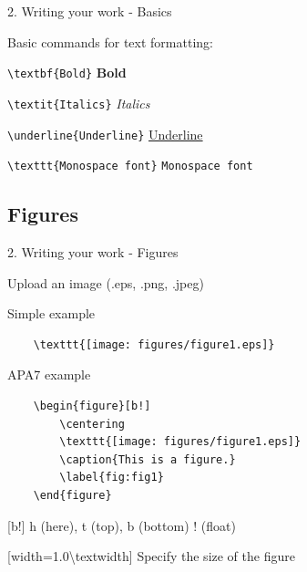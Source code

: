 \documentclass[13pt]{beamer}
\newcommand{\itemA}{\item[\textcolor{black}{\textbullet}]}
\newcommand{\itemB}{\item[\textcolor{black}{\textopenbullet}]}
\newcommand{\green}{\textcolor{colorgreen}}
\begin{document}
\begin{frame}{2. Writing your work - Basics}

 \begin{fullpageitemize}
    \itemA Basic commands for text formatting: \hfill \break
    \begin{fullpageitemize}
     \itemB {\footnotesize\texttt{\green{\textbackslash textbf}\{Bold\}}} \hspace{20mm} \textbf{Bold}\\
     \itemB {\footnotesize\texttt{\green{\textbackslash textit}\{Italics\}}} \hspace{15mm} \textit{Italics}\\
     \itemB {\footnotesize\texttt{\green{\textbackslash underline}\{Underline\}}} \hspace{8mm} \underline{Underline}
     \itemB {\footnotesize\texttt{\green{\textbackslash texttt}\{Monospace font\}}} \hspace{5mm} \texttt{Monospace font}
     \end{fullpageitemize}
 \end{fullpageitemize}
\end{frame}

\subsection{Figures}
\begin{frame}[fragile]{2. Writing your work - Figures}
\begin{fullpageitemize}
    \itemA Upload an image (.eps, .png, .jpeg)
    
    \itemA Simple example\\
    {\footnotesize
    \begin{verbatim}
    \texttt{[image: figures/figure1.eps]}
    \end{verbatim}
    }
    \itemA APA7 example
{\footnotesize
    \begin{verbatim}
    \begin{figure}[b!] 
        \centering
        \texttt{[image: figures/figure1.eps]}
        \caption{This is a figure.}
        \label{fig:fig1}
    \end{figure}
    \end{verbatim}
    }
    \begin{fullpageitemize}
    \itemB \green{[b!]} h (here), t (top), b (bottom) ! (float) 
    \itemB \green{[width=1.0\textbackslash textwidth]} Specify the size of the figure
    \end{fullpageitemize}
\end{fullpageitemize}

\end{frame}
\end{document}
